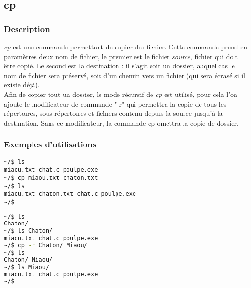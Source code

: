 \subsection{cp}
\subsubsection{Description}
\emph{cp} est une commande permettant de copier des fichier.
Cette commande prend en paramètres deux nom de fichier, le premier est le fichier \emph{source}, fichier qui doit être copié. Le second est la destination : il s'agit soit un dossier, auquel cas le nom de fichier sera préservé, soit d'un chemin vers un fichier (qui sera écrasé si il existe déjà).\\
Afin de copier tout un dossier, le mode récursif de \emph{cp} est utilisé, pour cela l'on ajoute le modificateur de commande "-r" qui permettra la copie de tous les répertoires, sous répertoires et fichiers contenu depuis la source jusqu'à la destination.
Sans ce modificateur, la commande cp omettra la copie de dossier.

\subsubsection{Exemples d'utilisations}

\begin{lstlisting}[caption=copie de fichier]
~/$ ls
miaou.txt chat.c poulpe.exe
~/$ cp miaou.txt chaton.txt
~/$ ls
miaou.txt chaton.txt chat.c poulpe.exe
~/$
\end{lstlisting}

\begin{lstlisting}[language=bash,caption=copie de dossier]
~/$ ls
Chaton/
~/$ ls Chaton/
miaou.txt chat.c poulpe.exe
~/$ cp -r Chaton/ Miaou/
~/$ ls
Chaton/ Miaou/
~/$ ls Miaou/
miaou.txt chat.c poulpe.exe
~/$
\end{lstlisting}
